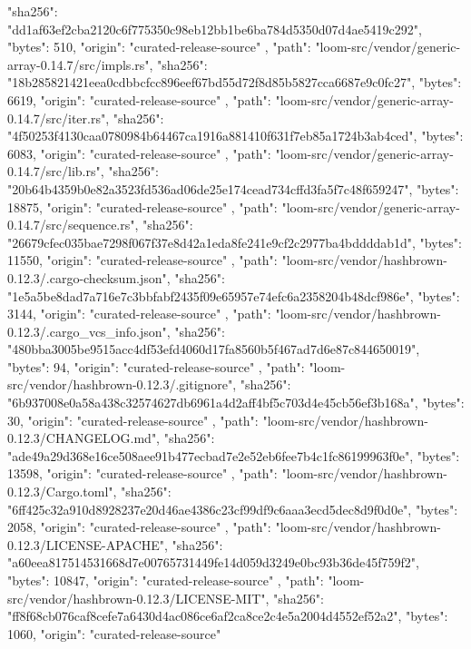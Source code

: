 {{      "sha256": "dd1af63ef2cba2120c6f775350c98eb12bb1be6ba784d5350d07d4ae5419c292",
      "bytes": 510,
      "origin": "curated-release-source"
    },
    {
      "path": "loom-src/vendor/generic-array-0.14.7/src/impls.rs",
      "sha256": "18b285821421eea0cdbbcfcc896eef67bd55d72f8d85b5827cca6687e9c0fc27",
      "bytes": 6619,
      "origin": "curated-release-source"
    },
    {
      "path": "loom-src/vendor/generic-array-0.14.7/src/iter.rs",
      "sha256": "4f50253f4130caa0780984b64467ca1916a881410f631f7eb85a1724b3ab4ced",
      "bytes": 6083,
      "origin": "curated-release-source"
    },
    {
      "path": "loom-src/vendor/generic-array-0.14.7/src/lib.rs",
      "sha256": "20b64b4359b0e82a3523fd536ad06de25e174cead734cffd3fa5f7c48f659247",
      "bytes": 18875,
      "origin": "curated-release-source"
    },
    {
      "path": "loom-src/vendor/generic-array-0.14.7/src/sequence.rs",
      "sha256": "26679cfec035bae7298f067f37e8d42a1eda8fe241e9cf2c2977ba4bddddab1d",
      "bytes": 11550,
      "origin": "curated-release-source"
    },
    {
      "path": "loom-src/vendor/hashbrown-0.12.3/.cargo-checksum.json",
      "sha256": "1e5a5be8dad7a716e7c3bbfabf2435f09e65957e74efc6a2358204b48dcf986e",
      "bytes": 3144,
      "origin": "curated-release-source"
    },
    {
      "path": "loom-src/vendor/hashbrown-0.12.3/.cargo_vcs_info.json",
      "sha256": "480bba3005be9515acc4df53efd4060d17fa8560b5f467ad7d6e87c844650019",
      "bytes": 94,
      "origin": "curated-release-source"
    },
    {
      "path": "loom-src/vendor/hashbrown-0.12.3/.gitignore",
      "sha256": "6b937008e0a58a438c32574627db6961a4d2aff4bf5c703d4e45cb56ef3b168a",
      "bytes": 30,
      "origin": "curated-release-source"
    },
    {
      "path": "loom-src/vendor/hashbrown-0.12.3/CHANGELOG.md",
      "sha256": "ade49a29d368e16ce508aee91b477ecbad7e2e52eb6fee7b4c1fc86199963f0e",
      "bytes": 13598,
      "origin": "curated-release-source"
    },
    {
      "path": "loom-src/vendor/hashbrown-0.12.3/Cargo.toml",
      "sha256": "6ff425c32a910d8928237e20d46ae4386c23cf99df9c6aaa3ecd5dec8d9f0d0e",
      "bytes": 2058,
      "origin": "curated-release-source"
    },
    {
      "path": "loom-src/vendor/hashbrown-0.12.3/LICENSE-APACHE",
      "sha256": "a60eea817514531668d7e00765731449fe14d059d3249e0bc93b36de45f759f2",
      "bytes": 10847,
      "origin": "curated-release-source"
    },
    {
      "path": "loom-src/vendor/hashbrown-0.12.3/LICENSE-MIT",
      "sha256": "ff8f68cb076caf8cefe7a6430d4ac086ce6af2ca8ce2c4e5a2004d4552ef52a2",
      "bytes": 1060,
      "origin": "curated-release-source"
}}
